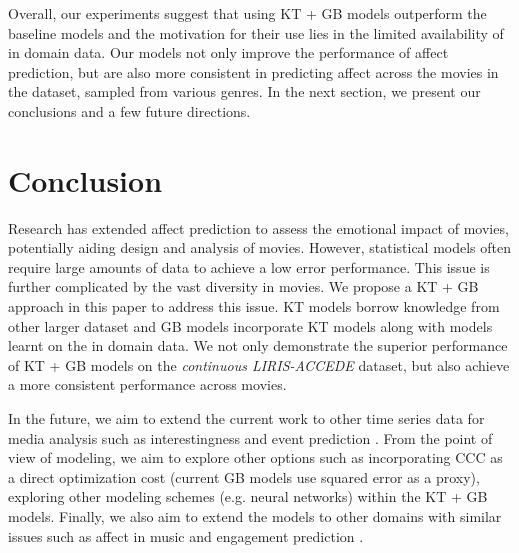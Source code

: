 \documentclass{article}
\begin{document}
Overall, our experiments suggest that using KT + GB models outperform the baseline models and the motivation for their use lies in the limited availability of in domain data.
Our models not only improve the performance of affect prediction, but are also more consistent in predicting affect across the movies in the dataset, sampled from various genres.
In the next section, we present our conclusions and a few future directions.

\section{Conclusion}

Research has extended affect prediction to assess the emotional impact of movies, potentially aiding design and analysis of movies.
However, statistical models often require large amounts of data to achieve a low error performance. 
This issue is further complicated by the vast diversity in movies.
We propose a KT + GB approach in this paper to address this issue.
KT models borrow knowledge from other larger dataset and GB models incorporate KT models along with models learnt on the in domain data. 
We not only demonstrate the superior performance of KT + GB models on the {\it continuous LIRIS-ACCEDE} dataset, but also achieve a more consistent performance across movies.

In the future, we aim to extend the current work to other time series data for media analysis such as interestingness \cite{chen2011violence} and event prediction \cite{butterfield2012interestingness}. 
From the point of view of modeling, we aim to explore other options such as incorporating CCC as a direct optimization cost (current GB models use squared error as a proxy), exploring other modeling schemes (e.g. neural networks) within the KT + GB models.
Finally, we also aim to extend the models to other domains with similar issues such as affect in music \cite{broekens2010real} and engagement prediction \cite{gupta2016analysis}. 

\footnotesize{
\begin{spacing}{.95 }


\end{spacing}
}
\end{document}
